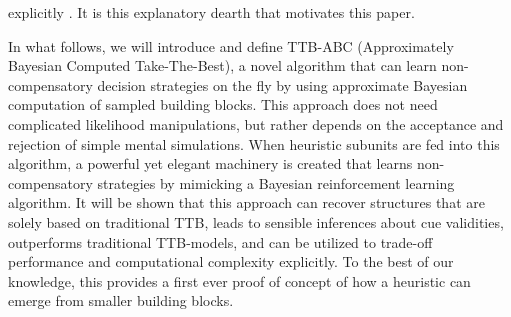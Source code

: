 \documentclass[a4paper,man, natbib]{apa6}
\begin{document}
explicitly . It is this explanatory dearth that motivates this paper.

In what follows, we will introduce and define TTB-ABC (Approximately Bayesian Computed Take-The-Best), a novel algorithm that can learn non-compensatory decision strategies on the fly by using approximate Bayesian computation of sampled building blocks. This approach does not need complicated likelihood manipulations, but rather depends on the acceptance and rejection of simple mental simulations. When heuristic subunits are fed into this algorithm, a powerful yet elegant machinery is created that learns non-compensatory strategies by mimicking a Bayesian reinforcement learning algorithm. It will be shown that this approach can recover structures that are solely based on traditional TTB, leads to sensible inferences about cue validities, outperforms traditional TTB-models, and can be utilized to trade-off performance and computational complexity explicitly. To the best of our knowledge, this provides a first ever proof of concept of how a heuristic can emerge from smaller building blocks.


\end{document}
